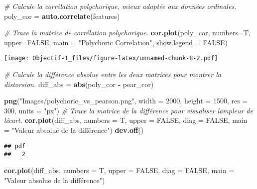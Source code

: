 \documentclass[
]{article}
\newenvironment{Shaded}{\begin{snugshade}}{\end{snugshade}}
\newcommand{\AttributeTok}[1]{\textcolor[rgb]{0.13,0.29,0.53}{#1}}
\newcommand{\CommentTok}[1]{\textcolor[rgb]{0.56,0.35,0.01}{\textit{#1}}}
\newcommand{\ConstantTok}[1]{\textcolor[rgb]{0.56,0.35,0.01}{#1}}
\newcommand{\DecValTok}[1]{\textcolor[rgb]{0.00,0.00,0.81}{#1}}
\newcommand{\FunctionTok}[1]{\textcolor[rgb]{0.13,0.29,0.53}{\textbf{#1}}}
\newcommand{\NormalTok}[1]{#1}
\newcommand{\OtherTok}[1]{\textcolor[rgb]{0.56,0.35,0.01}{#1}}
\newcommand{\SpecialCharTok}[1]{\textcolor[rgb]{0.81,0.36,0.00}{\textbf{#1}}}
\newcommand{\StringTok}[1]{\textcolor[rgb]{0.31,0.60,0.02}{#1}}
\begin{document}
\begin{Shaded}
\begin{Highlighting}[]
\CommentTok{\# Calcule la corrélation polychorique, mieux adaptée aux données ordinales.}
\NormalTok{poly\_cor }\OtherTok{=} \FunctionTok{auto.correlate}\NormalTok{(features)}

\CommentTok{\# Trace la matrice de corrélation polychorique.}
\FunctionTok{cor.plot}\NormalTok{(poly\_cor, }\AttributeTok{numbers=}\NormalTok{T, }\AttributeTok{upper=}\ConstantTok{FALSE}\NormalTok{, }\AttributeTok{main =} \StringTok{"Polychoric Correlation"}\NormalTok{, }\AttributeTok{show.legend =} \ConstantTok{FALSE}\NormalTok{)}
\end{Highlighting}
\end{Shaded}

\texttt{[image: Objectif-1\_files/figure-latex/unnamed-chunk-8-2.pdf]}

\begin{Shaded}
\begin{Highlighting}[]
\CommentTok{\# Calcule la différence absolue entre les deux matrices pour montrer la distorsion.}
\NormalTok{diff\_abs }\OtherTok{=} \FunctionTok{abs}\NormalTok{(poly\_cor }\SpecialCharTok{{-}}\NormalTok{ pear\_cor)}

\FunctionTok{png}\NormalTok{(}\StringTok{"Images/polychoric\_vs\_pearson.png"}\NormalTok{, }\AttributeTok{width =} \DecValTok{2000}\NormalTok{, }\AttributeTok{height =} \DecValTok{1500}\NormalTok{, }\AttributeTok{res =} \DecValTok{300}\NormalTok{, }\AttributeTok{units =} \StringTok{"px"}\NormalTok{)}
\CommentTok{\# Trace la matrice de la différence pour visualiser l\textquotesingle{}ampleur de l\textquotesingle{}écart.}
\FunctionTok{cor.plot}\NormalTok{(diff\_abs, }\AttributeTok{numbers =}\NormalTok{ T, }\AttributeTok{upper =} \ConstantTok{FALSE}\NormalTok{, }\AttributeTok{diag =} \ConstantTok{FALSE}\NormalTok{, }\AttributeTok{main =} \StringTok{"Valeur absolue de la différence"}\NormalTok{)}
\FunctionTok{dev.off}\NormalTok{()}
\end{Highlighting}
\end{Shaded}

\begin{verbatim}
## pdf 
##   2
\end{verbatim}

\begin{Shaded}
\begin{Highlighting}[]
\FunctionTok{cor.plot}\NormalTok{(diff\_abs, }\AttributeTok{numbers =}\NormalTok{ T, }\AttributeTok{upper =} \ConstantTok{FALSE}\NormalTok{, }\AttributeTok{diag =} \ConstantTok{FALSE}\NormalTok{, }\AttributeTok{main =} \StringTok{"Valeur absolue de la différence"}\NormalTok{)}
\end{Highlighting}
\end{Shaded}
\end{document}
